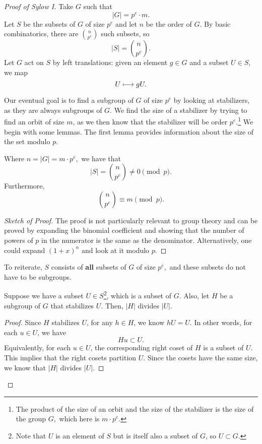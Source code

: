 \begin{proof}[Proof of Sylow I]
    Take $G$ such that \[|G| = p^e\cdot m.\]Let $S$ be the subsets of $G$ of size $p^e$ and let $n$ be the order of $G$. By basic combinatorics, there are $\binom{n}{p^e}$ such subsets, so \[|S| = \binom{n}{p^e}.\] Let $G$ act on $S$ by left translations: given an element $g \in G$ and a subset $U \in S$, we map \[U \longmapsto gU.\]

    Our eventual goal is to find a subgroup of $G$ of size $p^e$ by looking at stabilizers, as they are always subgroups of $G.$ We find the size of a stabilizer by trying to find an orbit of size $m$, as we then know that the stabilizer will be order $p^e$.\footnote{The product of the size of an orbit and the size of the stabilizer is the size of the group $G,$ which here is $m \cdot p^e.$}
    We begin with some lemmas. The first lemma provides information about the size of the set modulo $p.$ 
    \begin{lemma}
    Where $n = |G| = m \cdot p^e,$ we have that \[|S| = \binom{n}{ p^e} \neq 0 \pmod{p}.\] Furthermore, \[\binom{n}{ p^e} \equiv m \pmod{p}.\] 
    \end{lemma}
    \begin{proof}[Sketch of Proof]
        The proof is not particularly relevant to group theory and can be proved by expanding the binomial coefficient and showing that the number of powers of $p$ in the numerator is the same as the denominator. Alternatively, one could expand $(1+x)^n$ and look at it modulo $p$.
    \end{proof}
    
    To reiterate, $S$ consists of \textbf{all} subsets of $G$ of size $p^e,$ and these subsets do not have to be subgroups. 
    
    \begin{lemma}
        Suppose we have a subset $U \in S$\footnote{Note that $U$ is an element of $S$ but is itself also a subset of $G$, so $U \subset G.$}, which is a subset of $G$. Also, let $H$ be a subgroup of $G$ that stabilizes $U$. Then, $|H|$ divides $|U|.$
    \end{lemma}
    \begin{proof}
        Since $H$ stabilizes $U$, for any $h \in H$, we know $hU = U$. In other words, for each $u \in U$, we have \[Hu \subset U.\] Equivalently, for each $u\in U$, the corresponding right coset of $H$ is a subset of $U$. This implies that the right cosets partition $U$. Since the cosets have the same size, we know that $|H|$ divides $|U|$. 
    \end{proof}


\end{proof}
